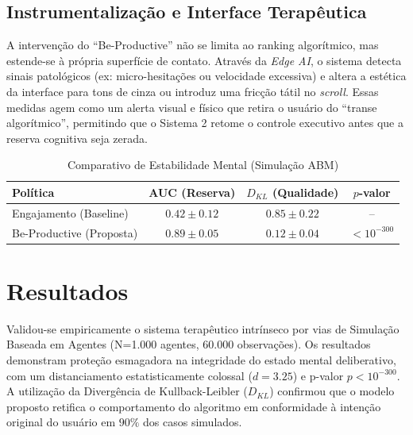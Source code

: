 \documentclass[12pt, a4paper]{article}
\begin{document}
\begin{algorithm}[h]
\caption{Rotina de Aferimento Emocional-Atencional (Edge AI)}
\end{algorithm}

\subsection{Instrumentalização e Interface Terapêutica}

A intervenção do ``Be-Productive'' não se limita ao ranking algorítmico, mas estende-se à própria superfície de contato. Através da \textit{Edge AI}, o sistema detecta sinais patológicos (ex: micro-hesitações ou velocidade excessiva) e altera a estética da interface para tons de cinza ou introduz uma fricção tátil no \textit{scroll}. Essas medidas agem como um alerta visual e físico que retira o usuário do ``transe algorítmico'', permitindo que o Sistema 2 retome o controle executivo antes que a reserva cognitiva seja zerada.

\begin{table}[h]
\centering
\caption{Comparativo de Estabilidade Mental (Simulação ABM)}
\begin{tabular}{lccc}
\toprule
\textbf{Política} & \textbf{AUC (Reserva)} & \textbf{$D_{KL}$ (Qualidade)} & \textbf{$p$-valor} \\
\midrule
Engajamento (Baseline) & $0.42 \pm 0.12$ & $0.85 \pm 0.22$ & -- \\
Be-Productive (Proposta) & $0.89 \pm 0.05$ & $0.12 \pm 0.04$ & $< 10^{-300}$ \\
\bottomrule
\end{tabular}
\end{table}

\section{Resultados}

Validou-se empiricamente o sistema terapêutico intrínseco por vias de Simulação Baseada em Agentes (N=1.000 agentes, 60.000 observações). Os resultados demonstram proteção esmagadora na integridade do estado mental deliberativo, com um distanciamento estatisticamente colossal ($d = 3.25$) e p-valor $p < 10^{-300}$. A utilização da Divergência de Kullback-Leibler ($D_{KL}$) confirmou que o modelo proposto retifica o comportamento do algoritmo em conformidade à intenção original do usuário em $90\%$ dos casos simulados.
\end{document}
